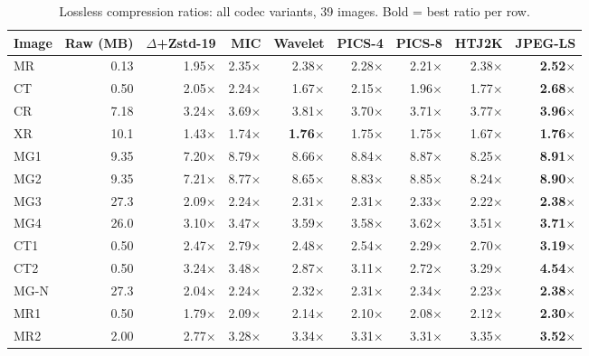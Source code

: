 \documentclass[journal]{IEEEtran}
\begin{document}
\begin{table}[t]
\centering
\caption{Lossless compression ratios: all codec variants, 39 images. Bold =
best ratio per row.}
\label{tab:ratios}
\scriptsize
\begin{tabular}{lrrrrrrrr}
\toprule
Image & Raw (MB) & $\Delta$+Zstd-19 & MIC & Wavelet & PICS-4 & PICS-8 & HTJ2K & JPEG-LS \\
\midrule
MR             & 0.13 & 1.95$\times$ & 2.35$\times$ & 2.38$\times$ & 2.28$\times$ & 2.21$\times$ & 2.38$\times$ & \textbf{2.52$\times$} \\
CT             & 0.50 & 2.05$\times$ & 2.24$\times$ & 1.67$\times$ & 2.15$\times$ & 1.96$\times$ & 1.77$\times$ & \textbf{2.68$\times$} \\
CR             & 7.18 & 3.24$\times$ & 3.69$\times$ & 3.81$\times$ & 3.70$\times$ & 3.71$\times$ & 3.77$\times$ & \textbf{3.96$\times$} \\
XR             & 10.1 & 1.43$\times$ & 1.74$\times$ & \textbf{1.76$\times$} & 1.75$\times$ & 1.75$\times$ & 1.67$\times$ & \textbf{1.76$\times$} \\
MG1            & 9.35 & 7.20$\times$ & 8.79$\times$ & 8.66$\times$ & 8.84$\times$ & 8.87$\times$ & 8.25$\times$ & \textbf{8.91$\times$} \\
MG2            & 9.35 & 7.21$\times$ & 8.77$\times$ & 8.65$\times$ & 8.83$\times$ & 8.85$\times$ & 8.24$\times$ & \textbf{8.90$\times$} \\
MG3            & 27.3 & 2.09$\times$ & 2.24$\times$ & 2.31$\times$ & 2.31$\times$ & 2.33$\times$ & 2.22$\times$ & \textbf{2.38$\times$} \\
MG4            & 26.0 & 3.10$\times$ & 3.47$\times$ & 3.59$\times$ & 3.58$\times$ & 3.62$\times$ & 3.51$\times$ & \textbf{3.71$\times$} \\
CT1            & 0.50 & 2.47$\times$ & 2.79$\times$ & 2.48$\times$ & 2.54$\times$ & 2.29$\times$ & 2.70$\times$ & \textbf{3.19$\times$} \\
CT2            & 0.50 & 3.24$\times$ & 3.48$\times$ & 2.87$\times$ & 3.11$\times$ & 2.72$\times$ & 3.29$\times$ & \textbf{4.54$\times$} \\
MG-N           & 27.3 & 2.04$\times$ & 2.24$\times$ & 2.32$\times$ & 2.31$\times$ & 2.34$\times$ & 2.23$\times$ & \textbf{2.38$\times$} \\
MR1            & 0.50 & 1.79$\times$ & 2.09$\times$ & 2.14$\times$ & 2.10$\times$ & 2.08$\times$ & 2.12$\times$ & \textbf{2.30$\times$} \\
MR2            & 2.00 & 2.77$\times$ & 3.28$\times$ & 3.34$\times$ & 3.31$\times$ & 3.31$\times$ & 3.35$\times$ & \textbf{3.52$\times$} \\

\end{tabular}
\end{table}
\end{document}
